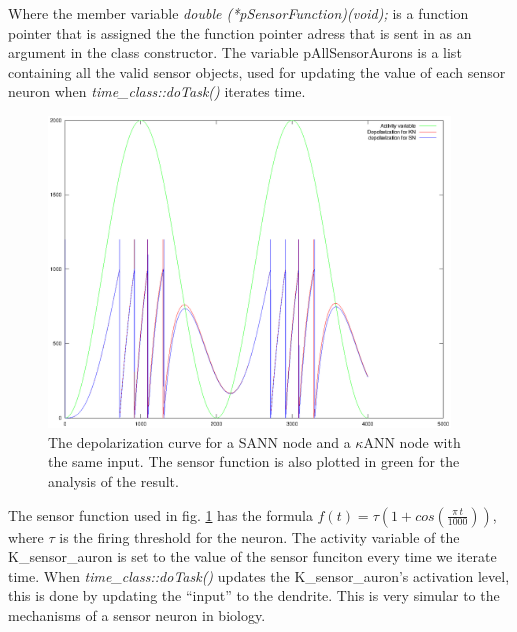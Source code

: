 Where the member variable \emph{double \mbox{(*pSensorFunction)(void);}} is a function pointer that is assigned the the function pointer adress that is sent in as an argument in the class constructor.
The variable pAllSensorAurons is a list containing all the valid sensor objects, used for updating the value of each sensor neuron when \emph{time\_class::doTask()} iterates time. %

\begin{figure}[hbtp!]
	\centering
		\includegraphics[width=0.95\textwidth]{eps_Comparison_between_the_two_sensors__depol.eps}
	\caption{The depolarization curve for a SANN node and a $\kappa$ANN node with the same input. The sensor function is also plotted in green for the analysis of the result.}
	\label{figComparisonBetweenSsensorAndKsensorDepolCurve}
\end{figure}

The sensor function used in fig. \ref{figComparisonBetweenSsensorAndKsensorDepolCurve} has the formula \mbox{$f(t) = \tau (1 + cos( \frac{\pi \, t}{1000} ))$}, where $\tau$ is the firing threshold for the neuron. 
The activity variable of the K\_sensor\_auron is set to the value of the sensor funciton every time we iterate time. %
When \emph{time\_class::doTask()} updates the K\_sensor\_auron's activation level, this is done by updating the ``input'' to the dendrite.
This is very simular to the mechanisms of a sensor neuron in biology. %

